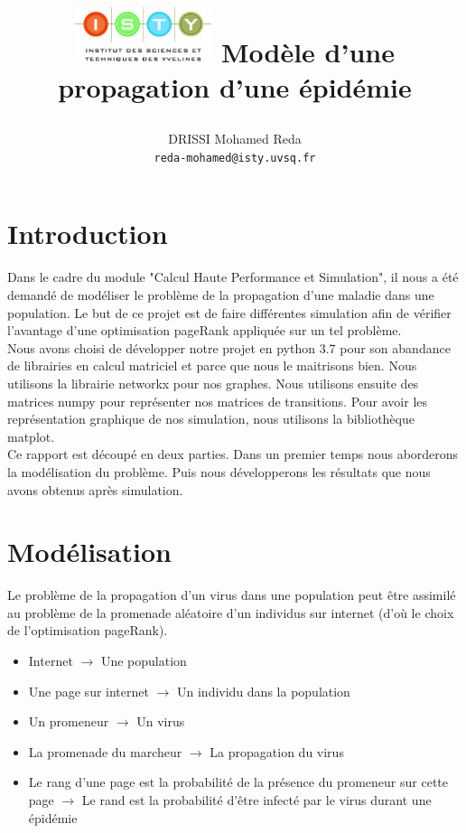 \documentclass{report}
\begin{document}
\title{
  \begin{minipage}\linewidth
      \centering
      \includegraphics[width=40mm]{resources/01.png}\vskip 20pt
      Modèle d’une propagation d’une épidémie
      \vskip 5pt
      \author{
        DRISSI Mohamed Reda \\
        \texttt{reda-mohamed@isty.uvsq.fr}
      }
    \end{minipage}
}
\maketitle
\newpage
\tableofcontents
\newpage
\section{Introduction}
Dans le cadre du module "Calcul Haute Performance et Simulation", il nous a été demandé de modéliser
le problème de la propagation d’une maladie dans une population. Le but de ce projet est de faire
différentes simulation afin de vérifier l'avantage d'une optimisation pageRank appliquée sur un
tel problème.\\

Nous avons choisi de développer notre projet en python 3.7 pour son abandance de librairies en calcul
matriciel et parce que nous le maitrisons bien. Nous utilisons la librairie networkx pour nos graphes.
Nous utilisons ensuite des matrices numpy pour représenter nos matrices de transitions.
Pour avoir les représentation graphique de nos simulation, nous utilisons la bibliothèque matplot.\\

Ce rapport est découpé en deux parties. Dans un premier temps nous aborderons la modélisation du problème.
Puis nous développerons les résultats que nous avons obtenus après simulation.
\section{Modélisation}
Le problème de la propagation d’un virus dans une population peut être assimilé au problème
de la promenade aléatoire d’un individus sur internet (d'où le choix de l'optimisation pageRank).
\vspace{3mm}
\begin{itemize}[label=$\bullet$]
  \item Internet $\rightarrow$ Une population
  \item Une page sur internet $\rightarrow$ Un individu dans la population
  \item Un promeneur $\rightarrow$ Un virus
  \item La promenade du marcheur $\rightarrow$ La propagation du virus
  \item Le rang d’une page est la probabilité de la présence du promeneur sur cette page $\rightarrow$
    Le rand est la probabilité d’être infecté par le virus durant une épidémie
\end{itemize}
\end{document}
